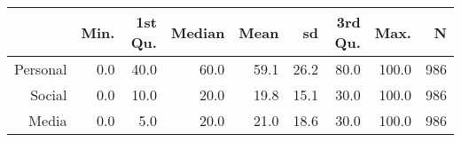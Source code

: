 \begin{table}[ht]
\centering
\begin{tabular}{rrrrrrrrr}
  \hline
 & Min. & 1st Qu. & Median & Mean & sd & 3rd Qu. & Max. & N \\ 
  \hline
Personal & 0.0 & 40.0 & 60.0 & 59.1 & 26.2 & 80.0 & 100.0 & 986 \\ 
  Social & 0.0 & 10.0 & 20.0 & 19.8 & 15.1 & 30.0 & 100.0 & 986 \\ 
  Media & 0.0 & 5.0 & 20.0 & 21.0 & 18.6 & 30.0 & 100.0 & 986 \\ 
   \hline
\end{tabular}
\end{table}
